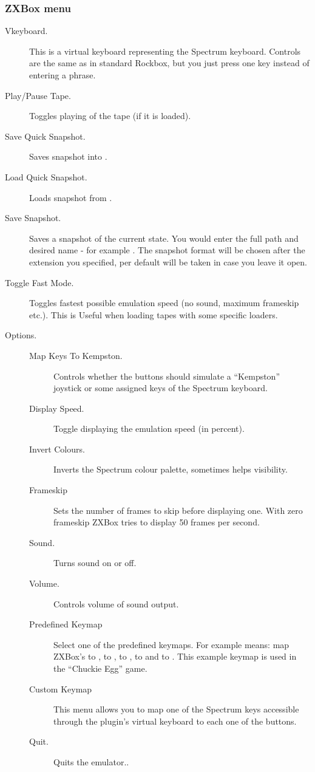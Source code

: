 \subsubsection{ZXBox menu}
\begin{description}
\item[ Vkeyboard.]
    This is a virtual keyboard representing the Spectrum keyboard. Controls are
    the same as in standard Rockbox, but you just press one key instead of
    entering a phrase.
\item[Play/Pause Tape.] Toggles playing of the tape (if it is loaded).
\item[Save Quick Snapshot.] Saves snapshot into .
\item[Load Quick Snapshot.] Loads snapshot from .
\item[Save Snapshot.]
    Saves a snapshot of the current state. You would enter the full path and
    desired name - for example . The
    snapshot format will be chosen after the extension you specified, per
    default  will be taken in case you leave it open.
\item[Toggle Fast Mode.]
    Toggles fastest possible emulation speed (no sound, maximum frameskip etc.).
    This is Useful when loading tapes with some specific loaders.
\item[Options.]
    \begin{description}
    \item[Map Keys To Kempston.]
        Controls whether the \daps{} buttons should simulate a ``Kempston''
        joystick or some assigned keys of the Spectrum keyboard.
    \item[Display Speed.]Toggle displaying the emulation speed (in percent).
    \item[Invert Colours.]
        Inverts the Spectrum colour palette, sometimes helps visibility.
    \item[Frameskip]
        Sets the number of frames to skip before displaying one. With zero
        frameskip ZXBox tries to display 50 frames per second.
    \item[Sound.]Turns sound on or off.
    \item[Volume.]Controls volume of sound output.
    \item[Predefined Keymap]
        Select one of the predefined keymaps. For example  means:
        map ZXBox's  to ,  to ,
         to ,  to  and
         to . This example keymap is used in the
        ``Chuckie Egg'' game.
    \item[Custom Keymap]
        This menu allows you to map one of the Spectrum keys accessible through the 
        plugin's virtual keyboard to each one of the buttons.
    \item[Quit.] Quits the emulator..
    \end{description}
\end{description}

